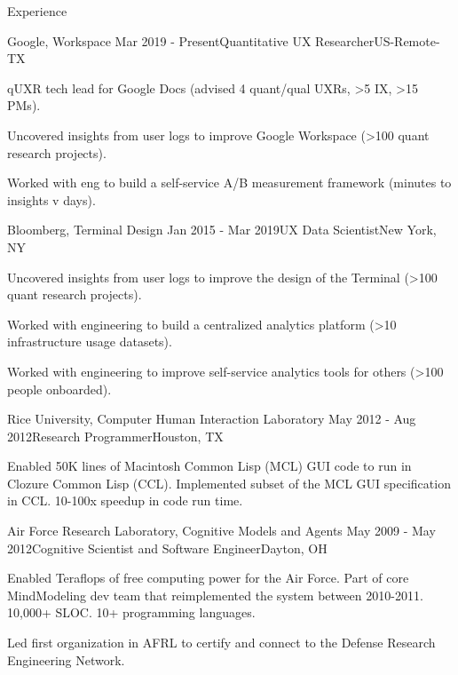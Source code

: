 
\begin{rSection}{Experience}

  \begin{rSubsection}{Google, Workspace}
    {Mar 2019 - Present}{Quantitative UX Researcher}{US-Remote-TX}
  \item qUXR tech lead for Google Docs (advised 4 quant/qual UXRs, \textgreater5 IX, \textgreater15 PMs).
  \item Uncovered insights from user logs to improve Google Workspace (\textgreater100 quant research projects).
  \item Worked with eng to build a self-service A/B measurement framework (minutes to insights v days).
  \end{rSubsection}

  \begin{rSubsection}{Bloomberg, Terminal Design}
    {Jan 2015 - Mar 2019}{UX Data Scientist}{New York, NY}
    \item Uncovered insights from user logs to improve the design of the Terminal (\textgreater100 quant research projects).
    \item Worked with engineering to build a centralized analytics platform (\textgreater10 infrastructure usage datasets).
    \item Worked with engineering to improve self-service analytics tools for others (\textgreater100 people onboarded). 
  \end{rSubsection}

  \begin{rSubsection}{Rice University, Computer Human Interaction Laboratory}
    {May 2012 - Aug 2012}{Research Programmer}{Houston, TX}
  \item Enabled 50K lines of Macintosh Common Lisp (MCL) GUI code to run in Clozure Common Lisp (CCL).
    Implemented subset of the MCL GUI specification in CCL. 10-100x speedup in code run time. 
  \end{rSubsection}

  \begin{rSubsection}{Air Force Research Laboratory, Cognitive Models and Agents}
    {May 2009 - May 2012}{Cognitive Scientist and Software Engineer}{Dayton, OH}
  \item 
    Enabled Teraflops of free computing power for the Air Force.
    Part of core MindModeling dev team that reimplemented the system between 2010-2011.
    10,000+ SLOC. 10+ programming languages. 
  \item
    Led first organization in AFRL to certify and connect to the Defense Research Engineering Network.
  \end{rSubsection}


\end{rSection}

